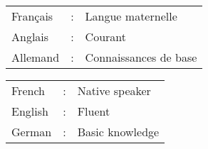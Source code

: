 \ifFrench
  \color{deepgray}
  \small
  \begin{tabular}{@{}l@{}ll@{}}
    Français & : & Langue maternelle     \\
    Anglais &:  & Courant               \\
    Allemand &: & Connaissances de base
  \end{tabular}
\else
  \color{deepgray}
  \small
  \begin{tabular}{@{}l@{}ll@{}}
    French&:  & Native speaker  \\
    English&: & Fluent          \\
    German&:  & Basic knowledge
  \end{tabular}
\fi